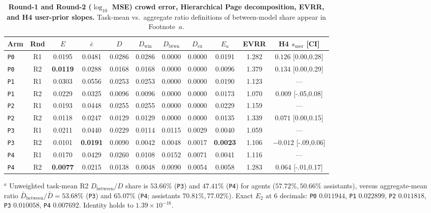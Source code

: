 \documentclass[11pt,letterpaper]{article}
\theoremstyle{plain}
\begin{document}
\begin{table}[t]
\centering
\caption{\textbf{Round-1 and Round-2 ($\log_{10}$ MSE) crowd error, Hierarchical Page decomposition, EVRR, and H4 user-prior slopes.} Task-mean vs.\ aggregate ratio definitions of between-model share appear in Footnote~$a$.}
\label{tab:main-metrics}
\scriptsize
\setlength{\tabcolsep}{2.4pt}
\begin{tabular}{@{}l c S[table-format=1.4] S[table-format=1.4] S[table-format=1.4] S[table-format=1.4] S[table-format=1.4] S[table-format=1.4] S[table-format=1.4] S[table-format=1.3] c@{}}
\toprule
\textbf{Arm} & \textbf{Rnd} & \textbf{$E$} & \textbf{$\bar{e}$} & \textbf{$D$} & \textbf{$D_{\text{win}}$} & \textbf{$D_{\text{btwn}}$} & \textbf{$D_{\text{ex}}$} & \textbf{$E_a$} & \textbf{EVRR} & \textbf{H4 $s_{\text{user}}$ [CI]} \\
\midrule
\texttt{P0} & R1 & 0.0195 & 0.0481 & 0.0286 & 0.0286 & 0.0000 & 0.0000 & 0.0191 & 1.282 & $0.126$ {\tiny[0.00,0.28]} \\
\texttt{P0} & R2 & \bfseries 0.0119 & 0.0288 & 0.0168 & 0.0168 & 0.0000 & 0.0000 & 0.0096 & 1.379 & $0.134$ {\tiny[0.00,0.29]} \\
\texttt{P1} & R1 & 0.0303 & 0.0556 & 0.0253 & 0.0253 & 0.0000 & 0.0000 & 0.0190 & 1.123 & --- \\
\texttt{P1} & R2 & 0.0229 & 0.0325 & 0.0096 & 0.0096 & 0.0000 & 0.0000 & 0.0173 & 1.070 & $0.009$ {\tiny[-.05,0.08]} \\
\texttt{P2} & R1 & 0.0193 & 0.0448 & 0.0255 & 0.0255 & 0.0000 & 0.0000 & 0.0229 & 1.159 & --- \\
\texttt{P2} & R2 & 0.0118 & 0.0247 & 0.0129 & 0.0129 & 0.0000 & 0.0000 & 0.0135 & 1.339 & $0.071$ {\tiny[0.00,0.15]} \\
\texttt{P3} & R1 & 0.0211 & 0.0440 & 0.0229 & 0.0114 & 0.0115 & 0.0029 & 0.0040 & 1.059 & --- \\
\texttt{P3} & R2 & 0.0101 & \bfseries 0.0191 & 0.0090 & 0.0042 & 0.0048 & 0.0017 & \bfseries 0.0023 & 1.106 & $-0.012$ {\tiny[-.09,0.06]} \\
\texttt{P4} & R1 & 0.0170 & 0.0429 & 0.0260 & 0.0108 & 0.0152 & 0.0071 & 0.0041 & 1.116 & --- \\
\texttt{P4} & R2 & \bfseries 0.0077 & 0.0215 & 0.0138 & 0.0048 & 0.0090 & 0.0054 & 0.0058 & 1.283 & $0.064$ {\tiny[-.01,0.17]} \\
\bottomrule
\end{tabular}
\par\vspace{2pt}
\raggedright\scriptsize
$^a$ Unweighted task-mean R2 $D_{\text{between}}/D$ share is $53.66\%$ (\texttt{P3}) and $47.41\%$ (\texttt{P4}) for agents ($57.72\%, 50.66\%$ assistants), versus aggregate-mean ratio $\bar{D}_{\text{between}}/\bar{D} = 53.68\%$ (\texttt{P3}) and $65.07\%$ (\texttt{P4}; assistants $70.81\%, 77.02\%$). Exact $E_2$ at 6 decimals: \texttt{P0} $0.011944$, \texttt{P1} $0.022899$, \texttt{P2} $0.011818$, \texttt{P3} $0.010058$, \texttt{P4} $0.007692$. Identity holds to $1.39\times 10^{-16}$.
\end{table}
\end{document}
